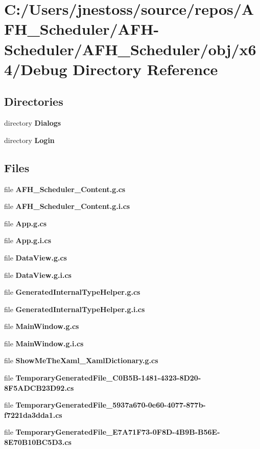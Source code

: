 \section{C\+:/\+Users/jnestoss/source/repos/\+A\+F\+H\+\_\+\+Scheduler/\+A\+F\+H-\/\+Scheduler/\+A\+F\+H\+\_\+\+Scheduler/obj/x64/\+Debug Directory Reference}
\label{dir_3bbff0e970a93bc6ab33ca0fdc397c7c}
\subsection*{Directories}
\begin{DoxyCompactItemize}
\item 
directory \textbf{ Dialogs}
\item 
directory \textbf{ Login}
\end{DoxyCompactItemize}
\subsection*{Files}
\begin{DoxyCompactItemize}
\item 
file \textbf{ A\+F\+H\+\_\+\+Scheduler\+\_\+\+Content.\+g.\+cs}
\item 
file \textbf{ A\+F\+H\+\_\+\+Scheduler\+\_\+\+Content.\+g.\+i.\+cs}
\item 
file \textbf{ App.\+g.\+cs}
\item 
file \textbf{ App.\+g.\+i.\+cs}
\item 
file \textbf{ Data\+View.\+g.\+cs}
\item 
file \textbf{ Data\+View.\+g.\+i.\+cs}
\item 
file \textbf{ Generated\+Internal\+Type\+Helper.\+g.\+cs}
\item 
file \textbf{ Generated\+Internal\+Type\+Helper.\+g.\+i.\+cs}
\item 
file \textbf{ Main\+Window.\+g.\+cs}
\item 
file \textbf{ Main\+Window.\+g.\+i.\+cs}
\item 
file \textbf{ Show\+Me\+The\+Xaml\+\_\+\+Xaml\+Dictionary.\+g.\+cs}
\item 
file \textbf{ Temporary\+Generated\+File\+\_\+C0\+B5\+B-\/1481-\/4323-\/8\+D20-\/8\+F5\+A\+D\+C\+B23\+D92.\+cs}
\item 
file \textbf{ Temporary\+Generated\+File\+\_\+5937a670-\/0e60-\/4077-\/877b-\/f7221da3dda1.\+cs}
\item 
file \textbf{ Temporary\+Generated\+File\+\_\+\+E7\+A71\+F73-\/0\+F8\+D-\/4\+B9\+B-\/\+B56\+E-\/8\+E70\+B10\+B\+C5\+D3.\+cs}
\end{DoxyCompactItemize}
